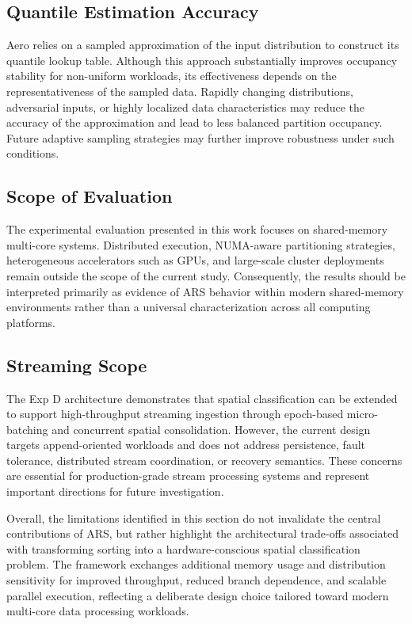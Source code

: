 \subsection{Quantile Estimation Accuracy}
Aero relies on a sampled approximation of the input distribution to construct its quantile lookup table.
Although this approach substantially improves occupancy stability for non-uniform workloads, its effectiveness depends on the representativeness of the sampled data.
Rapidly changing distributions, adversarial inputs, or highly localized data characteristics may reduce the accuracy of the approximation and lead to less balanced partition occupancy.
Future adaptive sampling strategies may further improve robustness under such conditions.

\subsection{Scope of Evaluation}
The experimental evaluation presented in this work focuses on shared-memory multi-core systems.
Distributed execution, NUMA-aware partitioning strategies, heterogeneous accelerators such as GPUs, and large-scale cluster deployments remain outside the scope of the current study.
Consequently, the results should be interpreted primarily as evidence of ARS behavior within modern shared-memory environments rather than a universal characterization across all computing platforms.

\subsection{Streaming Scope}
The Exp D architecture demonstrates that spatial classification can be extended to support high-throughput streaming ingestion through epoch-based micro-batching and concurrent spatial consolidation.
However, the current design targets append-oriented workloads and does not address persistence, fault tolerance, distributed stream coordination, or recovery semantics.
These concerns are essential for production-grade stream processing systems and represent important directions for future investigation.

Overall, the limitations identified in this section do not invalidate the central contributions of ARS, but rather highlight the architectural trade-offs associated with transforming sorting into a hardware-conscious spatial classification problem.
The framework exchanges additional memory usage and distribution sensitivity for improved throughput, reduced branch dependence, and scalable parallel execution, reflecting a deliberate design choice tailored toward modern multi-core data processing workloads.
